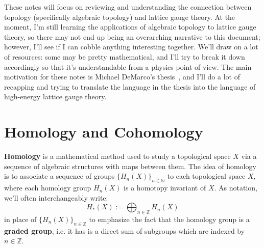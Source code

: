 \documentclass[12pt, oneside]{article}   	%
\theoremstyle{definition}
\begin{document}

%


These notes will focus on reviewing and understanding the connection between topology (specifically algebraic topology) and lattice gauge theory. At the moment, I'm still learning the applications of algebraic topology to lattice gauge theory, so there may not end up being an overarching narrative to this document; however, I'll see if I can cobble anything interesting together. We'll draw on a lot of resources: some may be pretty mathematical, and I'll try to break it down accordingly so that it's understandable from a physics point of view. The main motivation for these notes is Michael DeMarco's thesis~\cite{demarco_thesis}, and I'll do a lot of recapping and trying to translate the language in the thesis into the language of high-energy lattice gauge theory. 

\section{Homology and Cohomology}

\textbf{Homology} is a mathematical method used to study a topological space $X$ via a sequence of algebraic structures with maps between them. The idea of homology is to associate a sequence of groups $\{H_n(X)\}_{n\in\mathbb N}$ to each topological space $X$, where each homology group $H_n(X)$ is a homotopy invariant of $X$. As notation, we'll often interchangeably write:
\begin{equation}
	H_*(X) := \bigoplus_{n\in\mathbb Z} H_n(X)
\end{equation}
in place of $\{H_n(X)\}_{n\in\mathbb Z}$ to emphasize the fact that the homology group is a \textbf{graded group}, i.e. it has is a direct sum of subgroups which are indexed by $n\in\mathbb Z$. 
\end{document}
